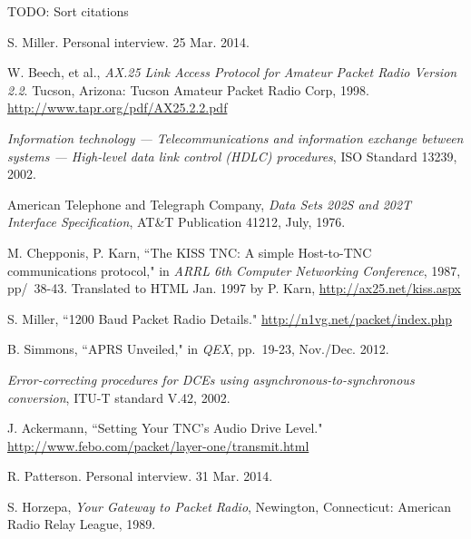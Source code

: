 \documentclass[12pt,letterpaper]{article}
\begin{document}
\begin{thebibliography}{99}

		TODO: Sort citations

		S. Miller. Personal interview. 25 Mar. 2014.

		W. Beech, et al.,
		\emph{AX.25 Link Access Protocol for Amateur Packet Radio Version 2.2}.
		Tucson, Arizona: Tucson Amateur Packet Radio Corp, 1998. 
		\url{http://www.tapr.org/pdf/AX25.2.2.pdf}

		\emph{Information technology --- Telecommunications and information
			exchange between systems --- High-level data link control (HDLC)
		procedures}, ISO Standard 13239, 2002.

		American Telephone and Telegraph Company,
		\emph{Data Sets 202S and 202T Interface Specification},
		AT\&T Publication 41212,
		July, 1976.

		M. Chepponis, P. Karn,
		``The KISS TNC: A simple Host-to-TNC communications protocol,"
		in \emph{ARRL 6th Computer Networking Conference},
		1987, pp/~38-43.
		Translated to HTML Jan. 1997 by P. Karn,
		\url{http://ax25.net/kiss.aspx}

		S. Miller,
		``1200 Baud Packet Radio Details."
		\url{http://n1vg.net/packet/index.php}

		B. Simmons,
		``APRS Unveiled," in \emph{QEX},
		pp.~19-23,
		Nov./Dec. 2012.

		\emph{Error-correcting procedures for DCEs using 
		asynchronous-to-synchronous conversion}, ITU-T standard V.42, 2002.

		J. Ackermann,
		``Setting Your TNC's Audio Drive Level."
		\url{http://www.febo.com/packet/layer-one/transmit.html}

		R. Patterson. Personal interview. 31 Mar. 2014.

		S. Horzepa,
		\emph{Your Gateway to Packet Radio},
		Newington, Connecticut: American Radio Relay League, 1989.

\end{thebibliography}
\end{document}
